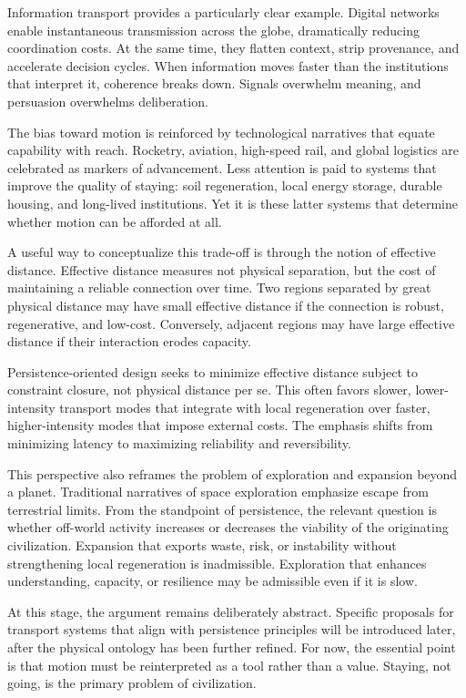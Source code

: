 \documentclass[12pt,oneside]{book}
\begin{document}
Information transport provides a particularly clear example. Digital networks enable instantaneous transmission across the globe, dramatically reducing coordination costs. At the same time, they flatten context, strip provenance, and accelerate decision cycles. When information moves faster than the institutions that interpret it, coherence breaks down. Signals overwhelm meaning, and persuasion overwhelms deliberation.

The bias toward motion is reinforced by technological narratives that equate capability with reach. Rocketry, aviation, high-speed rail, and global logistics are celebrated as markers of advancement. Less attention is paid to systems that improve the quality of staying: soil regeneration, local energy storage, durable housing, and long-lived institutions. Yet it is these latter systems that determine whether motion can be afforded at all.

A useful way to conceptualize this trade-off is through the notion of effective distance. Effective distance measures not physical separation, but the cost of maintaining a reliable connection over time. Two regions separated by great physical distance may have small effective distance if the connection is robust, regenerative, and low-cost. Conversely, adjacent regions may have large effective distance if their interaction erodes capacity.

Persistence-oriented design seeks to minimize effective distance subject to constraint closure, not physical distance per se. This often favors slower, lower-intensity transport modes that integrate with local regeneration over faster, higher-intensity modes that impose external costs. The emphasis shifts from minimizing latency to maximizing reliability and reversibility.

This perspective also reframes the problem of exploration and expansion beyond a planet. Traditional narratives of space exploration emphasize escape from terrestrial limits. From the standpoint of persistence, the relevant question is whether off-world activity increases or decreases the viability of the originating civilization. Expansion that exports waste, risk, or instability without strengthening local regeneration is inadmissible. Exploration that enhances understanding, capacity, or resilience may be admissible even if it is slow.

At this stage, the argument remains deliberately abstract. Specific proposals for transport systems that align with persistence principles will be introduced later, after the physical ontology has been further refined. For now, the essential point is that motion must be reinterpreted as a tool rather than a value. Staying, not going, is the primary problem of civilization.
\end{document}
